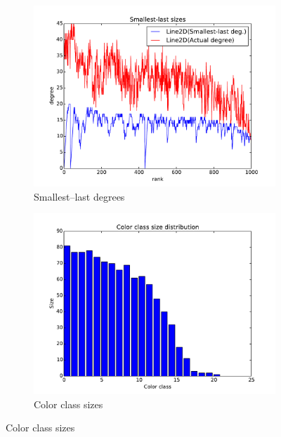 \documentclass[oneside, titlepage]{scrartcl}
\begin{document}
\begin{figure}[!h]
\begin{subfigure}{0.5\textwidth}
	\centering
	\includegraphics[width=0.9\linewidth]{figures/ordering1.pdf}
	\caption{Smallest--last degrees}
\end{subfigure}%
\begin{subfigure}{0.5\textwidth}
	\centering
	\includegraphics[width=0.9\linewidth]{figures/colors1.pdf}
	\caption{Color class sizes}
\end{subfigure}


\end{figure}
\end{document}
